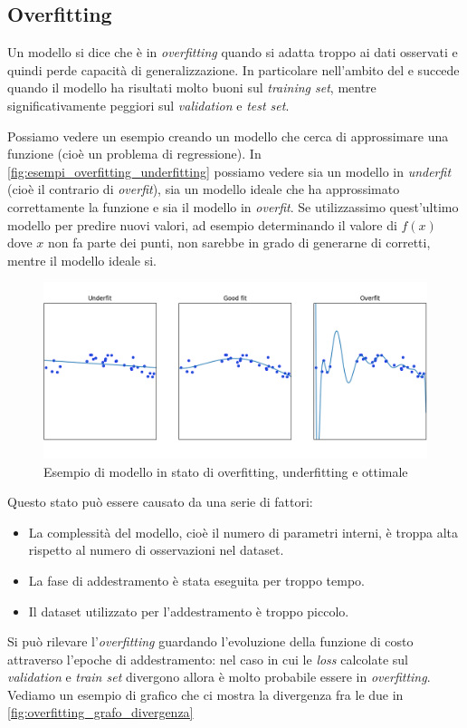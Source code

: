 \subsection{Overfitting}\label{subsec:overfitting}
Un modello si dice che è in \textit{overfitting} quando si adatta troppo ai dati osservati e quindi perde capacità di generalizzazione.
In particolare nell'ambito del \ML{} e \DL{} succede quando il modello ha risultati molto buoni sul \textit{training set}, mentre significativamente peggiori sul \textit{validation} e \textit{test set}.

Possiamo vedere un esempio creando un modello che cerca di approssimare una funzione (cioè un problema di regressione). 
In \autoref{fig:esempi_overfitting_underfitting} possiamo vedere sia un modello in \textit{underfit} (cioè il contrario di \textit{overfit}), sia un modello ideale che ha approssimato correttamente la funzione e sia il modello in \textit{overfit}.
Se utilizzassimo quest'ultimo modello per predire nuovi valori, ad esempio determinando il valore di $f(x)$ dove $x$ non fa parte dei punti, non sarebbe in grado di generarne di corretti, mentre il modello ideale si.

\begin{figure}[h]
    \centering
    \includegraphics[scale=0.5]{images/esempio_overfitting_resize.png}
    \caption{Esempio di modello in stato di overfitting, underfitting e ottimale}
    \label{fig:esempi_overfitting_underfitting}
\end{figure}
Questo stato può essere causato da una serie di fattori:
    \begin{itemize}
        \item La complessità del modello, cioè il numero di parametri interni, è troppa alta rispetto al numero di osservazioni nel dataset.
        \item La fase di addestramento è stata eseguita per troppo tempo.
        \item Il dataset utilizzato per l'addestramento è troppo piccolo.
    \end{itemize}
Si può rilevare l'\textit{overfitting} guardando l'evoluzione della funzione di costo attraverso l'epoche di addestramento: nel caso in cui le \textit{loss} calcolate sul \textit{validation} e \textit{train set} divergono allora è molto probabile essere in \textit{overfitting}.
Vediamo un esempio di grafico che ci mostra la divergenza fra le due in \autoref{fig:overfitting_grafo_divergenza}

